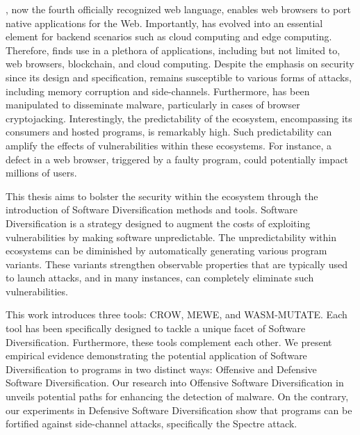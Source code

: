 \Wasm, now the fourth officially recognized web language, enables web browsers to port native applications for the Web. 
Importantly, \Wasm has evolved into an essential element for backend scenarios such as cloud computing and edge computing. 
Therefore, \Wasm finds use in a plethora of applications, including but not limited to, web browsers, blockchain, and cloud computing. 
Despite the emphasis on security since its design and specification, \Wasm remains susceptible to various forms of attacks, including memory corruption and side-channels. 
Furthermore, \Wasm has been manipulated to disseminate malware, particularly in cases of browser cryptojacking. 
Interestingly, the predictability of the \Wasm ecosystem, encompassing its consumers and hosted programs, is remarkably high. 
Such predictability can amplify the effects of vulnerabilities within these ecosystems. 
For instance, a defect in a web browser, triggered by a faulty \Wasm program, could potentially impact millions of users. 

This thesis aims to bolster the security within the \Wasm ecosystem through the introduction of Software Diversification methods and tools. 
Software Diversification is a strategy designed to augment the costs of exploiting vulnerabilities by making software unpredictable.
The unpredictability within ecosystems can be diminished by automatically generating various program variants. 
These variants strengthen observable properties that are typically used to launch attacks, and in many instances, can completely eliminate such vulnerabilities. 


This work introduces three tools: CROW, MEWE, and WASM-MUTATE. 
Each tool has been specifically designed to tackle a unique facet of Software Diversification. 
Furthermore, these tools complement each other. 
We present empirical evidence demonstrating the potential application of Software Diversification to \Wasm programs in two distinct ways: Offensive and Defensive Software Diversification. 
Our research into Offensive Software Diversification in \Wasm unveils potential paths for enhancing the detection of \Wasm malware. 
On the contrary, our experiments in Defensive Software Diversification show that \Wasm programs can be fortified against side-channel attacks, specifically the Spectre attack.


